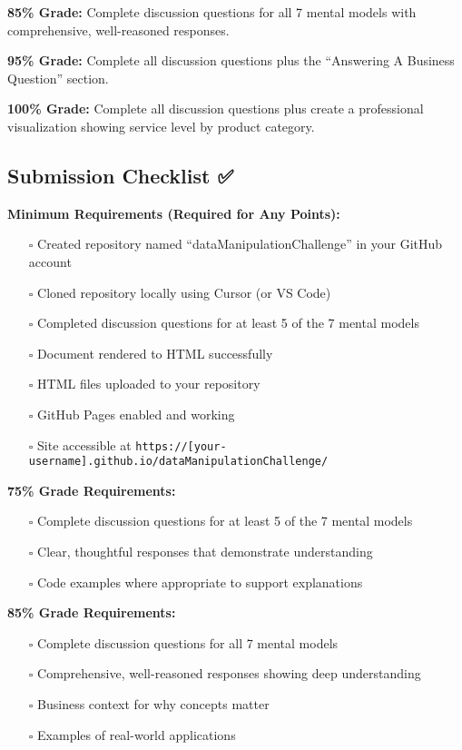 \documentclass[
  letterpaper,
  DIV=11,
  numbers=noendperiod]{scrartcl}
\providecommand{\tightlist}{%
  \setlength{\itemsep}{0pt}\setlength{\parskip}{0pt}}
\begin{document}
\textbf{85\% Grade:} Complete discussion questions for all 7 mental
models with comprehensive, well-reasoned responses.

\textbf{95\% Grade:} Complete all discussion questions plus the
``Answering A Business Question'' section.

\textbf{100\% Grade:} Complete all discussion questions plus create a
professional visualization showing service level by product category.

\subsection{Submission Checklist ✅}\label{submission-checklist}

\textbf{Minimum Requirements (Required for Any Points):}

\begin{itemize}
\tightlist
\item[$\square$]
  Created repository named ``dataManipulationChallenge'' in your GitHub
  account
\item[$\square$]
  Cloned repository locally using Cursor (or VS Code)
\item[$\square$]
  Completed discussion questions for at least 5 of the 7 mental models
\item[$\square$]
  Document rendered to HTML successfully
\item[$\square$]
  HTML files uploaded to your repository
\item[$\square$]
  GitHub Pages enabled and working
\item[$\square$]
  Site accessible at
  \texttt{https://{[}your-username{]}.github.io/dataManipulationChallenge/}
\end{itemize}

\textbf{75\% Grade Requirements:}

\begin{itemize}
\tightlist
\item[$\square$]
  Complete discussion questions for at least 5 of the 7 mental models
\item[$\square$]
  Clear, thoughtful responses that demonstrate understanding
\item[$\square$]
  Code examples where appropriate to support explanations
\end{itemize}

\textbf{85\% Grade Requirements:}

\begin{itemize}
\tightlist
\item[$\square$]
  Complete discussion questions for all 7 mental models
\item[$\square$]
  Comprehensive, well-reasoned responses showing deep understanding
\item[$\square$]
  Business context for why concepts matter
\item[$\square$]
  Examples of real-world applications
\end{itemize}
\end{document}
